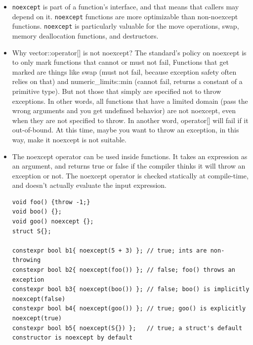 \documentclass[a4paper,11pt,twoside]{book}
\begin{document}
\begin{itemize}
    \item \texttt{noexcept} is part of a function's interface, and that means that callers may depend on it.  \texttt{noexcept} functions are more optimizable than non-noexcept functions. \texttt{noexcept} is particularly valuable for the move operations, swap, memory deallocation functions, and destructors.

    \item Why vector::operator[] is not noexcept? The standard's policy on noexcept is to only mark functions that cannot or must not fail, Functions that get marked are things like swap (must not fail, because exception safety often relies on that) and numeric\_limits::min (cannot fail, returns a constant of a primitive type). But not those that simply are specified not to throw exceptions. In other words, all functions that have a limited domain (pass the wrong arguments and you get undefined behavior) are not noexcept, even when they are not specified to throw. In another word, operator[] will fail if it out-of-bound. At this time, maybe you want to throw an exception, in this way, make it noexcept is not suitable.


    \item The noexcept operator can be used inside functions. It takes an expression as an argument, and returns true or false if the compiler thinks it will throw an exception or not. The noexcept operator is checked statically at compile-time, and doesn’t actually evaluate the input expression.
\begin{lstlisting}
void foo() {throw -1;}
void boo() {};
void goo() noexcept {};
struct S{};

constexpr bool b1{ noexcept(5 + 3) }; // true; ints are non-throwing
constexpr bool b2{ noexcept(foo()) }; // false; foo() throws an exception
constexpr bool b3{ noexcept(boo()) }; // false; boo() is implicitly noexcept(false)
constexpr bool b4{ noexcept(goo()) }; // true; goo() is explicitly noexcept(true)
constexpr bool b5{ noexcept(S{}) };   // true; a struct's default constructor is noexcept by default
\end{lstlisting}

\end{itemize}
\end{document}
